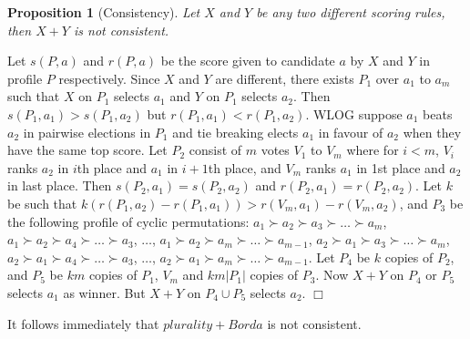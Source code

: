 \documentclass{ecai2012}
\newcommand{\winner}[2]{\mbox{$#1 + #2$}}
\newtheorem{proposition}{Proposition}
\newcommand{\myproof}{\vspace{-3mm}\noindent {\bf Proof:\ \ }}
\newcommand{\myqed}{\mbox{$\Box$}}
\begin{document}
\begin{proposition}[Consistency]
Let $X$ and $Y$ be any two different
scoring rules, then
$\winner{X}{Y}$ is not consistent.
\end{proposition}
\myproof
Let $s(P,a)$ and $r(P,a)$ be
the score given to candidate $a$
by $X$ and $Y$ in profile $P$ respectively.
Since $X$ and $Y$ are different, there exists
$P_1$ over $a_1$ to $a_m$ such that $X$ on $P_1$
selects $a_1$ and $Y$ on $P_1$ selects $a_2$.
Then $s(P_1,a_1) > s(P_1,a_2)$ but
$r(P_1,a_1) < r(P_1,a_2)$.
WLOG suppose $a_1$ beats $a_2$ in pairwise
elections in $P_1$ and tie breaking elects
$a_1$ in favour of $a_2$ when they have the
same top score.
Let $P_2$ consist of $m$ votes $V_1$ to $V_m$
where for $i<m$, $V_i$ ranks $a_2$ in $i$th
place and $a_1$ in $i+1$th place, and
$V_m$ ranks $a_1$ in 1st place and $a_2$ in last
place.
Then $s(P_2,a_1) = s(P_2,a_2)$ and
$r(P_2,a_1) = r(P_2,a_2)$.
Let $k$ be such that $k(r(P_1,a_2)-r(P_1,a_1)) > r(V_m,a_1)-r(V_m,a_2)$,
and $P_3$ be the following profile of cyclic
permutations:
$a_1 \succ a_2 \succ a_3 \succ \ldots \succ a_m$,
$a_1 \succ a_2 \succ a_4 \succ \ldots \succ a_3$,
$\ldots$,
$a_1 \succ a_2 \succ a_m \succ \ldots \succ a_{m-1}$,
$a_2 \succ a_1 \succ a_3 \succ \ldots \succ a_m$,
$a_2 \succ a_1 \succ a_4 \succ \ldots \succ a_3$,
$\ldots$,
$a_2 \succ a_1 \succ a_m \succ \ldots \succ a_{m-1}$.
Let $P_4$ be $k$ copies of $P_2$,
and $P_5$ be $km$ copies of $P_1$,
$V_m$ and $km|P_1|$ copies of $P_3$.
Now $\winner{X}{Y}$ on $P_4$ or $P_5$ selects $a_1$ as winner.
But $\winner{X}{Y}$ on $P_4 \cup P_5$ selects $a_2$.
\myqed

It follows immediately that $\winner{plurality}{Borda}$
is not consistent.

\vspace{-2mm}
\end{document}
